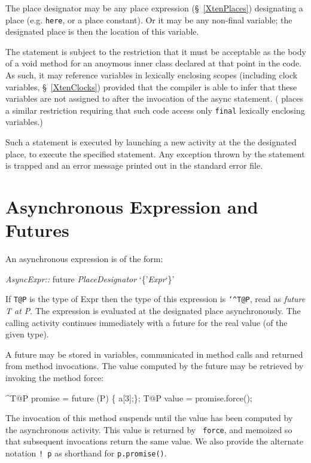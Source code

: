 The place designator may be any place expression (\S~\ref{XtenPlaces})
designating a place (e.g.{} {\tt here}, or a place constant). Or it
may be any non-final variable; the designated place is then the
location of this variable.

The statement is subject to the restriction that it must be acceptable
as the body of a {\cf void} method for an anoymous inner class
declared at that point in the code. As such, it may reference
variables in lexically enclosing scopes (including {\cf clock}
variables, \S~\ref{XtenClocks}) provided that the compiler is able to
infer that these variables are not assigned to after the invocation of
the {\cf async} statement.  (\java{} places a similar restriction
requiring that such code access only {\tt final} lexically enclosing
variables.)

Such a statement is executed by launching a new activity at the the
designated place, to execute the specified statement. Any exception
thrown by the statement is trapped and an error message printed out in
the standard error file.


\section{Asynchronous Expression and Futures}\label{XtenFutures}

An asynchronous expression is of the form:
\begin{x10}
 {\cf\em AsyncExpr::} 
    future {\cf\em{}PlaceDesignator} `\{'{\cf\em{}Expr}`\}' 
\end{x10} 
\def\Hat{{\tt \char`\^}}
If {\tt T@P} is the type of {\cf Expr} then the type of this
expression is {\tt\Hat T@P}, read as {\em future {\cf T} at {\cf P}}.
The expression is evaluated at the designated place
asynchronously. The calling activity continues immediately with a 
future for the real value (of the given type). 

A future may be stored in variables, communicated in
method calls and returned from method invocations. The value computed
by the future may be retrieved by invoking the method {\cf force}:

\begin{x10}
 ^T@P promise = future (P) \{ a[3];\};
 T@P value = promise.force();
\end{x10}
The invocation of this method suspends until the value has been
computed by the asynchronous activity. This value is returned by {\tt
force}, and memoized so that subsequent invocations return the same
value. We also provide the alternate notation {\tt ! p} 
as shorthand for {\tt p.promise()}.


